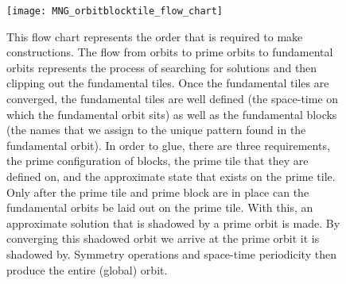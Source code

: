 
\begin{figure}
\begin{minipage}[height=.05\textheight]{.5\textwidth}
\centering
\texttt{[image: MNG\_orbitblocktile\_flow\_chart]}
\end{minipage}
\caption{ \label{fig:MNG_flowchart}
This flow chart represents the order that is required to make
{\spt} constructions. The flow from orbits to prime orbits to fundamental
orbits represents the process of searching for solutions and then clipping
out the fundamental tiles. Once the fundamental tiles are converged, the
fundamental tiles are well defined (the space-time on which the fundamental
orbit sits) as well as the fundamental blocks (the names that we assign
to the unique pattern found in the fundamental orbit). In order to glue,
there are three requirements, the prime configuration of blocks, the
prime tile that they are defined on, and the
approximate state that exists on the prime tile. Only after the prime
tile and prime block are in place can the fundamental orbits be
laid out on the prime tile. With this, an approximate solution that is
shadowed by a prime orbit is made. By converging this shadowed orbit
we arrive at the prime orbit it is shadowed by. Symmetry operations and
space-time periodicity then produce the entire (global) orbit.
}
\end{figure}